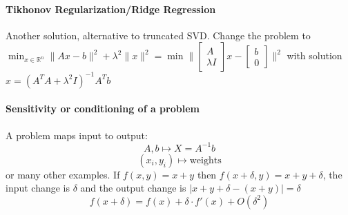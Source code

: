 \documentclass[10pt]{report}
\begin{document}
\paragraph{Tikhonov Regularization/Ridge Regression} Another solution, alternative to truncated SVD. Change the problem to $\min_{x\in \mathbb{R}^n} \|Ax-b\|^2 + \lambda^2\|x\|^2 = \min\|\left[\begin{array}{c}
A\\\lambda I
\end{array}\right]x - \left[\begin{array}{c}
b\\0
\end{array}\right]\|^2$ with solution $x = (A^TA+\lambda^2 I)^{-1}A^Tb$
\paragraph{Sensitivity or conditioning of a problem} A problem maps input to output: $$A,b\mapsto X=A^{-1}b$$ $$(x_i,y_i)\mapsto\text{weights}$$ or many other examples. If $f(x,y) = x+y$ then $f(x+\delta, y) = x+y+\delta$, the input change is $\delta$ and the output change is $|x+y+\delta - (x+y)| = \delta$
$$f(x+\delta) = f(x)+\delta\cdot f'(x) + O(\delta^2)$$
\end{document}
